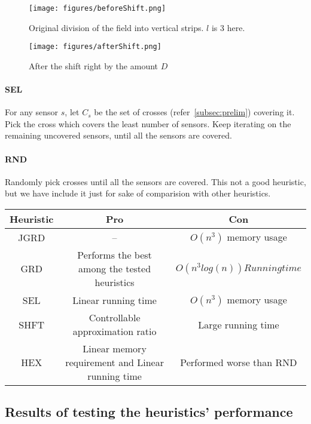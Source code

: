\begin{figure}[H]
\centering
\texttt{[image: figures/beforeShift.png]}
\caption{Original division of the field into vertical strips. $l$ is 3 here.} \label{fig:origStrip}

\end{figure}

\begin{figure}[H]
\centering
\texttt{[image: figures/afterShift.png]}

\caption{After the shift right by the amount $D$}\label{fig:shiftStrip}

\end{figure}

\paragraph*{SEL} 
  
For any sensor $s$, let $C_s$ be the set of crosses 
(refer~\ref{subsec:prelim}) covering it. Pick the cross which covers the 
least number of sensors. Keep iterating on the remaining uncovered sensors, until all the sensors are covered.

\paragraph*{RND} Randomly pick crosses until all the sensors are covered. This not a good heuristic, but we have include it just for sake of comparision with other heuristics.


\begin{center}
 \begin{tabular}{||c c c||} 
 \hline
 Heuristic & Pro & Con  \\  
 \hline\hline
 JGRD & -- & $O(n^3)$ memory usage \\ 
 \hline
 GRD & Performs the best among the tested heuristics & $O(n^3log(n)) Running time$ \\
 \hline
 SEL & Linear running time & $O(n^3)$ memory usage \\
 \hline
 SHFT & Controllable approximation ratio & Large running time \\
 \hline
 HEX & Linear memory requirement and Linear running time & Performed worse than RND \\
 \hline
\end{tabular}
\end{center}


\subsection{Results of testing the heuristics' performance}

